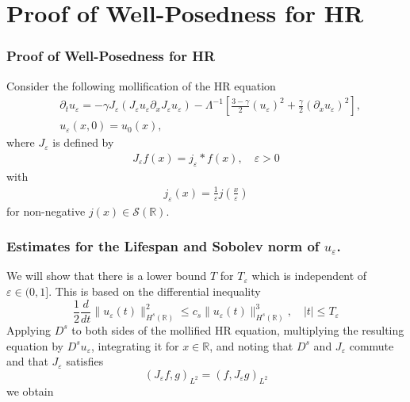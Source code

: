 \documentclass{beamer}
\newcommand{\rr}{\mathbb{R}}
\newcommand{\p}{\partial}
\newcommand{\ee}{\varepsilon}
\begin{document}
\section{Proof of Well-Posedness for HR}
\begin{frame}[allowframebreaks]
\frametitle{Proof of Well-Posedness for HR}
%
%
%
%
%
%
%
%
%
%
Consider the following mollification of the HR equation
%
%
\begin{align*}
& \p_t  u_\ee =
-\gamma J_\ee(J_\ee u_\ee \partial_x  J_\ee  u_\ee) - \Lambda^{-1} \left 
[\frac{3-\gamma}{2}(u_\ee)^2 + \frac{\gamma}{2}(\p_x u_\ee)^2 \right ],
\\
& u_\ee(x, 0) = u_0 (x),
\label{hr-moli-data}
\end{align*}
%
% 
%
%
%
%
%
%
where $J_\ee$ is defined  by
%
\begin{equation*}
\begin{split}
J_\ee f(x) = j_\ee * f(x), \quad \ee>0
\end{split}
\end{equation*}
%
with 
%
\begin{equation*}
\begin{split}
j_\ee(x) = \frac{1}{\ee}j\left( \frac{x}{\ee} \right)
\end{split}
\end{equation*}
%
for non-negative $j(x) \in
\mathcal{S}(\rr)$.
\end{frame}
%
%
%
%

\begin{frame}
\frametitle{Estimates for the Lifespan and Sobolev norm of $u_\ee$.}
%
We will show that there is a lower bound  $T$
for $T_\ee$ which is independent of $\ee\in(0, 1]$.
This is based on the differential
inequality 
%
%
%
\begin{equation*} \label{B-diff-ineq}
\frac 12
\frac{d}{dt}
\|u_\ee(t)\|_{H^{s}(\rr)}^2
\le
c_s
\|u_\ee(t)\|_{H^{s}(\rr)}^3,
\quad
|t| \le T_\ee
\end{equation*}
%
%
%
%
%
%
%
Applying $D^s$ to both sides of the mollified HR equation,
multiplying the resulting equation by $D^s u_\ee$,
integrating it for $x\in\rr$, and noting that 
$D^s$ and $J_\ee$ commute
and that  $J_\ee$ satisfies 
%
%
\begin{equation*} 
\label{J-e-inner-prod-property}
(J_\ee f, g)_{L^2}=( f, J_\ee g)_{L^2}
\end{equation*}
%
%
we obtain

\end{frame}
\end{document}
